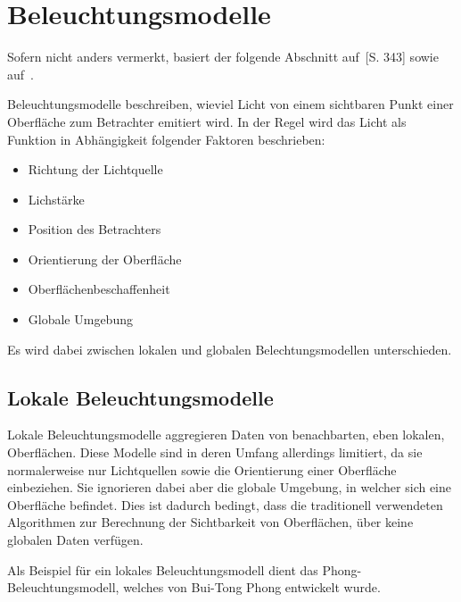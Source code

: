 
\section{Beleuchtungsmodelle}
\label{sec:illumination_models}

Sofern nicht anders vermerkt, basiert der folgende Abschnitt auf~\cite{whitted_improved_1980}[S. 343] sowie auf~\cite{hughes_computer_2013}.

Beleuchtungsmodelle beschreiben, wieviel Licht von einem sichtbaren Punkt einer Oberfläche zum Betrachter emitiert wird. In der Regel wird das Licht als Funktion in Abhängigkeit folgender Faktoren beschrieben:
\begin{itemize}
    \item Richtung der Lichtquelle \item Lichstärke
    \item Position des Betrachters
    \item Orientierung der Oberfläche
    \item Oberflächenbeschaffenheit
    \item Globale Umgebung
\end{itemize}

Es wird dabei zwischen lokalen und globalen Belechtungsmodellen unterschieden.

\subsection{Lokale Beleuchtungsmodelle}
\label{subsec:local_illumination_models}


Lokale Beleuchtungsmodelle aggregieren Daten von benachbarten, eben lokalen, Oberflächen. Diese Modelle sind in deren Umfang allerdings limitiert, da sie normalerweise nur Lichtquellen sowie die Orientierung einer Oberfläche einbeziehen. Sie ignorieren dabei aber die globale Umgebung, in welcher sich eine Oberfläche befindet.
Dies ist dadurch bedingt, dass die traditionell verwendeten Algorithmen zur Berechnung der Sichtbarkeit von Oberflächen, über keine globalen Daten verfügen.

Als Beispiel für ein lokales Beleuchtungsmodell dient das Phong-Beleuchtungsmodell, welches von Bui-Tong Phong entwickelt wurde.


